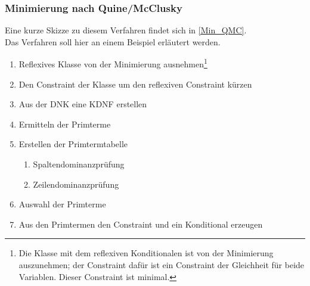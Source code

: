 \documentclass[a4paper, 11pt]{book}
\begin{document}
\subsubsection{Minimierung nach Quine/McClusky} \label{Min_Besch_QMC} 
Eine kurze Skizze zu diesem Verfahren findet sich in \ref{Min_QMC}.\\
Das Verfahren soll hier an einem Beispiel erläutert werden.
\begin{enumerate}
	\item Reflexives Klasse von der Minimierung ausnehmen\footnote{Die Klasse mit dem reflexiven Konditionalen ist von der Minimierung auszunehmen; der Constraint dafür ist ein Constraint der Gleichheit für beide Variablen. Dieser Constraint ist minimal.}
	\item Den Constraint der Klasse um den reflexiven Constraint kürzen
	\item Aus der DNK eine KDNF erstellen 
	\item Ermitteln der Primterme
	\item Erstellen der Primtermtabelle
	\begin{enumerate}
		\item Spaltendominanzprüfung
		\item Zeilendominanzprüfung
	\end{enumerate}
	\item Auswahl der Primterme
	\item Aus den Primtermen den Constraint und ein Konditional erzeugen	
\end{enumerate}
\end{document}

